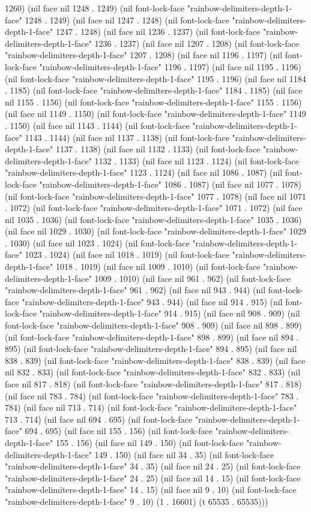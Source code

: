 1260) (nil face nil 1248 . 1249) (nil font-lock-face "rainbow-delimiters-depth-1-face" 1248 . 1249) (nil face nil 1247 . 1248) (nil font-lock-face "rainbow-delimiters-depth-1-face" 1247 . 1248) (nil face nil 1236 . 1237) (nil font-lock-face "rainbow-delimiters-depth-1-face" 1236 . 1237) (nil face nil 1207 . 1208) (nil font-lock-face "rainbow-delimiters-depth-1-face" 1207 . 1208) (nil face nil 1196 . 1197) (nil font-lock-face "rainbow-delimiters-depth-1-face" 1196 . 1197) (nil face nil 1195 . 1196) (nil font-lock-face "rainbow-delimiters-depth-1-face" 1195 . 1196) (nil face nil 1184 . 1185) (nil font-lock-face "rainbow-delimiters-depth-1-face" 1184 . 1185) (nil face nil 1155 . 1156) (nil font-lock-face "rainbow-delimiters-depth-1-face" 1155 . 1156) (nil face nil 1149 . 1150) (nil font-lock-face "rainbow-delimiters-depth-1-face" 1149 . 1150) (nil face nil 1143 . 1144) (nil font-lock-face "rainbow-delimiters-depth-1-face" 1143 . 1144) (nil face nil 1137 . 1138) (nil font-lock-face "rainbow-delimiters-depth-1-face" 1137 . 1138) (nil face nil 1132 . 1133) (nil font-lock-face "rainbow-delimiters-depth-1-face" 1132 . 1133) (nil face nil 1123 . 1124) (nil font-lock-face "rainbow-delimiters-depth-1-face" 1123 . 1124) (nil face nil 1086 . 1087) (nil font-lock-face "rainbow-delimiters-depth-1-face" 1086 . 1087) (nil face nil 1077 . 1078) (nil font-lock-face "rainbow-delimiters-depth-1-face" 1077 . 1078) (nil face nil 1071 . 1072) (nil font-lock-face "rainbow-delimiters-depth-1-face" 1071 . 1072) (nil face nil 1035 . 1036) (nil font-lock-face "rainbow-delimiters-depth-1-face" 1035 . 1036) (nil face nil 1029 . 1030) (nil font-lock-face "rainbow-delimiters-depth-1-face" 1029 . 1030) (nil face nil 1023 . 1024) (nil font-lock-face "rainbow-delimiters-depth-1-face" 1023 . 1024) (nil face nil 1018 . 1019) (nil font-lock-face "rainbow-delimiters-depth-1-face" 1018 . 1019) (nil face nil 1009 . 1010) (nil font-lock-face "rainbow-delimiters-depth-1-face" 1009 . 1010) (nil face nil 961 . 962) (nil font-lock-face "rainbow-delimiters-depth-1-face" 961 . 962) (nil face nil 943 . 944) (nil font-lock-face "rainbow-delimiters-depth-1-face" 943 . 944) (nil face nil 914 . 915) (nil font-lock-face "rainbow-delimiters-depth-1-face" 914 . 915) (nil face nil 908 . 909) (nil font-lock-face "rainbow-delimiters-depth-1-face" 908 . 909) (nil face nil 898 . 899) (nil font-lock-face "rainbow-delimiters-depth-1-face" 898 . 899) (nil face nil 894 . 895) (nil font-lock-face "rainbow-delimiters-depth-1-face" 894 . 895) (nil face nil 838 . 839) (nil font-lock-face "rainbow-delimiters-depth-1-face" 838 . 839) (nil face nil 832 . 833) (nil font-lock-face "rainbow-delimiters-depth-1-face" 832 . 833) (nil face nil 817 . 818) (nil font-lock-face "rainbow-delimiters-depth-1-face" 817 . 818) (nil face nil 783 . 784) (nil font-lock-face "rainbow-delimiters-depth-1-face" 783 . 784) (nil face nil 713 . 714) (nil font-lock-face "rainbow-delimiters-depth-1-face" 713 . 714) (nil face nil 694 . 695) (nil font-lock-face "rainbow-delimiters-depth-1-face" 694 . 695) (nil face nil 155 . 156) (nil font-lock-face "rainbow-delimiters-depth-1-face" 155 . 156) (nil face nil 149 . 150) (nil font-lock-face "rainbow-delimiters-depth-1-face" 149 . 150) (nil face nil 34 . 35) (nil font-lock-face "rainbow-delimiters-depth-1-face" 34 . 35) (nil face nil 24 . 25) (nil font-lock-face "rainbow-delimiters-depth-1-face" 24 . 25) (nil face nil 14 . 15) (nil font-lock-face "rainbow-delimiters-depth-1-face" 14 . 15) (nil face nil 9 . 10) (nil font-lock-face "rainbow-delimiters-depth-1-face" 9 . 10) (1 . 16601) (t 65535 . 65535)))
